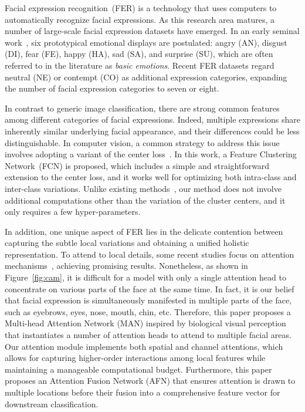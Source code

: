 \documentclass{article}
\begin{document}
Facial expression recognition~(FER) is a technology that uses computers to automatically recognize facial expressions. As this research area matures, a number of large-scale facial expression datasets have emerged. In an early seminal work~\cite{ekman1971constants}, six prototypical emotional displays are postulated: angry (AN), disgust (DI), fear (FE), happy (HA), sad (SA), and surprise (SU), which are often referred to in the literature as \textit{{basic emotions}}. Recent FER datasets regard neutral (NE) or contempt (CO) as additional expression categories, expanding the number of facial expression categories to seven or eight.



In contrast to generic image classification, there are strong common features among different categories of facial expressions. Indeed, multiple expressions share inherently similar underlying facial appearance, and their differences could be less distinguishable. In computer vision, a common strategy to address this issue involves adopting a variant of the center loss~\cite{wen2016discriminative}. In this work, {a Feature Clustering Network~(FCN) is proposed}, which includes a simple and straightforward extension to the center loss, and it works well for optimizing both intra-class and inter-class variations. Unlike existing methods~\cite{cai2018island,li2018facial,farzaneh2021facial}, our method does not involve additional computations other than the variation of the cluster centers, {and it only requires a few hyper-parameters.}

In addition, one unique aspect of FER lies in the delicate contention between capturing the subtle local variations and obtaining a unified holistic representation.
To attend to local details, some recent studies focus on attention mechanisms~\cite{farzaneh2021facial,fernandez2019feratt,li2020attention}, achieving promising results. Nonetheless, as shown in Figure~\ref{fig:cam}, it is difficult for a model with only a single attention head to concentrate on various parts of the face at the same time.
In fact, {it is our belief} that facial expression is simultaneously manifested in multiple parts of the face, such as eyebrows, eyes, nose, mouth, chin, etc.
Therefore, {this paper} proposes a Multi-head Attention Network (MAN) inspired by biological visual perception that instantiates a number of attention heads to attend to multiple facial areas. Our attention module implements both spatial and channel attentions, which allows for capturing higher-order interactions among local features while maintaining a manageable computational budget. Furthermore, {this paper} proposes an Attention Fusion Network (AFN) that ensures attention is drawn to multiple locations before their {fusion into a comprehensive feature vector for downstream classification}.
\end{document}
